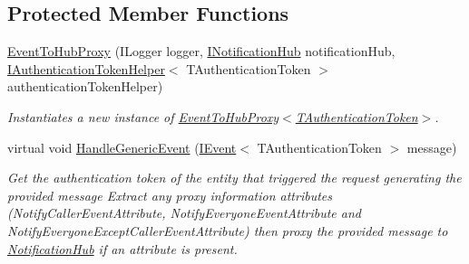 \subsection*{Protected Member Functions}
\begin{DoxyCompactItemize}
\item 
\hyperlink{classCqrs_1_1WebApi_1_1Events_1_1Handlers_1_1EventToHubProxy_a11ce35ab8f01b97b95b757e246c9cdcd_a11ce35ab8f01b97b95b757e246c9cdcd}{Event\+To\+Hub\+Proxy} (I\+Logger logger, \hyperlink{interfaceCqrs_1_1WebApi_1_1SignalR_1_1Hubs_1_1INotificationHub}{I\+Notification\+Hub} notification\+Hub, \hyperlink{interfaceCqrs_1_1Authentication_1_1IAuthenticationTokenHelper}{I\+Authentication\+Token\+Helper}$<$ T\+Authentication\+Token $>$ authentication\+Token\+Helper)
\begin{DoxyCompactList}\small\item\em Instantiates a new instance of \hyperlink{classCqrs_1_1WebApi_1_1Events_1_1Handlers_1_1EventToHubProxy_a11ce35ab8f01b97b95b757e246c9cdcd_a11ce35ab8f01b97b95b757e246c9cdcd}{Event\+To\+Hub\+Proxy$<$\+T\+Authentication\+Token$>$}. \end{DoxyCompactList}\item 
virtual void \hyperlink{classCqrs_1_1WebApi_1_1Events_1_1Handlers_1_1EventToHubProxy_a310fc8d40bfbe514406716150f30b74d_a310fc8d40bfbe514406716150f30b74d}{Handle\+Generic\+Event} (\hyperlink{interfaceCqrs_1_1Events_1_1IEvent}{I\+Event}$<$ T\+Authentication\+Token $>$ message)
\begin{DoxyCompactList}\small\item\em Get the authentication token of the entity that triggered the request generating the provided {\itshape message}  Extract any proxy information attributes (Notify\+Caller\+Event\+Attribute, Notify\+Everyone\+Event\+Attribute and Notify\+Everyone\+Except\+Caller\+Event\+Attribute) then proxy the provided {\itshape message}  to \hyperlink{classCqrs_1_1WebApi_1_1Events_1_1Handlers_1_1EventToHubProxy_a3e27dc5fb1315bc8200487fbf9b3b47f_a3e27dc5fb1315bc8200487fbf9b3b47f}{Notification\+Hub} if an attribute is present. \end{DoxyCompactList}\end{DoxyCompactItemize}
